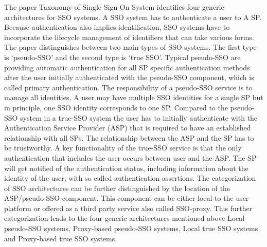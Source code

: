 {{The paper Taxonomy of Single Sign-On System \cite{Pashalidis:2003:10.1007/3-540-45067-X_22} identifies four generic architectures for SSO systems. A SSO system has to authenticate a user to A SP. Because authentication also implies identification, SSO systems have to incorporate the lifecycle management of identifiers that can take various forms. The paper distinguishes between two main types of SSO systems. The first type is ‘pseudo-SSO’ and the second type is ‘true SSO’. Typical pseudo-SSO are providing automatic authentication for all SP specific authentication methods after the user initially authenticated with the pseudo-SSO component, which is called primary authentication. The responsibility of a pseudo-SSO service is to manage all identities. A user may have multiple SSO identities for a single SP but in principle, one SSO identity corresponds to one SP. Compared to the pseudo-SSO system in a true-SSO system the user has to initially authenticate with the Authentication Service Provider (ASP) that is required to have an established relationship with all SPs. The relationship between the ASP and the SP has to be trustworthy. A key functionality of the true-SSO service is that the only authentication that includes the user occurs between user and the ASP. The SP will get notified of the authentication status, including information about the identity of the user, with so called authentication assertions. The categorization of SSO architectures can be further distinguished by the location of the ASP/pseudo-SSO component. This component can be either local to the user platform or offered as a third party service also called SSO-proxy. This further categorization leads \cite{Pashalidis:2003:10.1007/3-540-45067-X_22} to the four generic architectures mentioned above Local pseudo-SSO systems, Proxy-based pseudo-SSO systems, Local true SSO systems and Proxy-based true SSO systems.

}}
